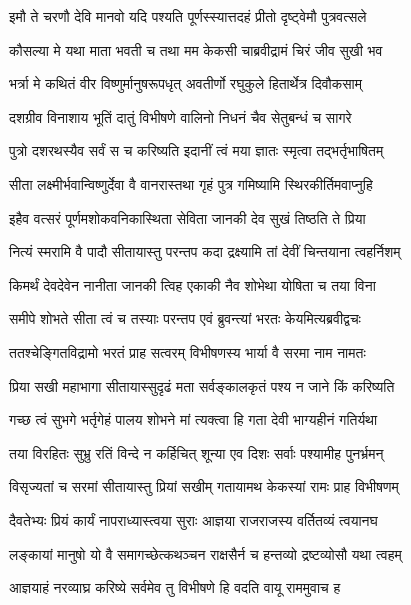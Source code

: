 \twolineshloka
{इमौ ते चरणौ देवि मानवो यदि पश्यति}
{पूर्णस्स्यात्तदहं प्रीतो दृष्ट्वेमौ पुत्रवत्सले}%

\twolineshloka
{कौसल्या मे यथा माता भवती च तथा मम}
{केकसी चाब्रवीद्रामं चिरं जीव सुखी भव}%

\twolineshloka
{भर्त्रा मे कथितं वीर विष्णुर्मानुषरूपधृत्}
{अवतीर्णो रघुकुले हितार्थेत्र दिवौकसाम्}%

\twolineshloka
{दशग्रीव विनाशाय भूतिं दातुं विभीषणे}
{वालिनो निधनं चैव सेतुबन्धं च सागरे}%

\twolineshloka
{पुत्रो दशरथस्यैव सर्वं स च करिष्यति}
{इदानीं त्वं मया ज्ञातः स्मृत्वा तद्भर्तृभाषितम्}%

\twolineshloka
{सीता लक्ष्मीर्भवान्विष्णुर्देवा वै वानरास्तथा}
{गृहं पुत्र गमिष्यामि स्थिरकीर्तिमवाप्नुहि}%


\twolineshloka
{इहैव वत्सरं पूर्णमशोकवनिकास्थिता}
{सेविता जानकी देव सुखं तिष्ठति ते प्रिया}%

\twolineshloka
{नित्यं स्मरामि वै पादौ सीतायास्तु परन्तप}
{कदा द्रक्ष्यामि तां देवीं चिन्तयाना त्वहर्निशम्}%

\twolineshloka
{किमर्थं देवदेवेन नानीता जानकी त्विह}
{एकाकी नैव शोभेथा योषिता च तया विना}%

\twolineshloka
{समीपे शोभते सीता त्वं च तस्याः परन्तप}
{एवं ब्रुवन्त्यां भरतः केयमित्यब्रवीद्वचः}%

\twolineshloka
{ततश्चेङ्गितविद्रामो भरतं प्राह सत्वरम्}
{विभीषणस्य भार्या वै सरमा नाम नामतः}%

\twolineshloka
{प्रिया सखी महाभागा सीतायास्सुदृढं मता}
{सर्वङ्कालकृतं पश्य न जाने किं करिष्यति}%

\twolineshloka
{गच्छ त्वं सुभगे भर्तृगेहं पालय शोभने}
{मां त्यक्त्वा हि गता देवी भाग्यहीनं गतिर्यथा}%

\twolineshloka
{तया विरहितः सुभ्रु रतिं विन्दे न कर्हिचित्}
{शून्या एव दिशः सर्वाः पश्यामीह पुनर्भ्रमन्}%

\twolineshloka
{विसृज्यतां च सरमां सीतायास्तु प्रियां सखीम्}
{गतायामथ केकस्यां रामः प्राह विभीषणम्}%

\twolineshloka
{दैवतेभ्यः प्रियं कार्यं नापराध्यास्त्वया सुराः}
{आज्ञया राजराजस्य वर्तितव्यं त्वयानघ}%

\twolineshloka
{लङ्कायां मानुषो यो वै समागच्छेत्कथञ्चन}
{राक्षसैर्न च हन्तव्यो द्रष्टव्योसौ यथा त्वहम्}%


\twolineshloka
{आज्ञयाहं नरव्याघ्र करिष्ये सर्वमेव तु}
{विभीषणे हि वदति वायू राममुवाच ह}%


